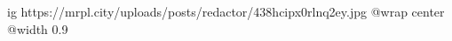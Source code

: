  
 
 
 
 

\ifcmt
  ig https://mrpl.city/uploads/posts/redactor/438hcipx0rlnq2ey.jpg
  @wrap center
  @width 0.9
\fi
